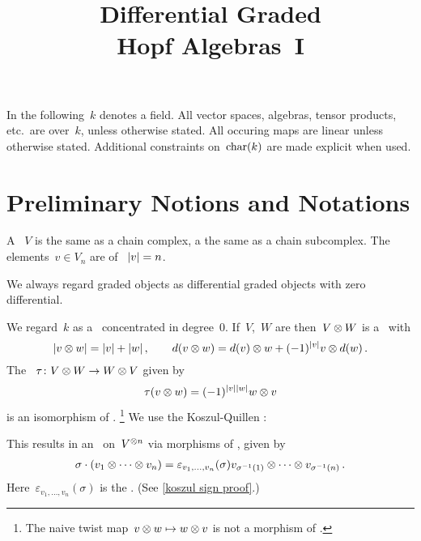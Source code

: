 \documentclass[a4paper,10pt,headings=standardclasses]{scrartcl}
\title{Differential Graded \\ Hopf Algebras~I}
\author{}
\date{}
\begin{document}
\maketitle

\vspace{-4em}

In the following~$k$ denotes a field.
All vector spaces, algebras, tensor products, etc.\ are over~$k$, unless otherwise stated.
All occuring maps are linear unless otherwise stated.
Additional constraints on~$\operatorname{char}(k)$ are made explicit when used.





\section{Preliminary Notions and Notations}
\label{notions and notations}

A ~$V$ is the same as a chain complex, a  the same as a chain subcomplex.
The elements~$v \in V_n$ are  of ~$\lvert v\rvert = n$.
\begin{center}
\end{center}
We always regard graded objects as differential graded objects with zero differential.
\begin{center}
\end{center}
We regard~$k$ as a~{\dgv} concentrated in degree~$0$.
If~$V$,~$W$ are {\dgvs} then~$V \otimes W$ is a {\dgv}~with
\[
  \lvert v \otimes w\rvert
  =
  \lvert v\rvert + \lvert w\rvert \,,
  \qquad
  d(v \otimes w)
  =
  d(v) \otimes w + (-1)^{\lvert v\rvert} v \otimes d(w) \,.
\]
The ~$\tau \colon V \otimes W \to W \otimes V$ given by
\[
  \tau(v \otimes w)
  =
  (-1)^{\lvert v\rvert \lvert w\rvert}
  w \otimes v
\]
is an isomorphism of {\dgvs}.%
\footnote{The naive twist map~$v \otimes w \mapsto w \otimes v$ is not a morphism of {\dgvs}.}
We use the Koszul-Quillen :
\begin{center}
\end{center}
This results in an~{} on~$V^{\otimes n}$ via morphisms of {\dgvs}, given by
\begin{gather*}
  \sigma \cdot (v_1 \otimes \dotsb \otimes v_n)
  =
  \varepsilon_{v_1, \dotsc, v_n}(\sigma)
  v_{\sigma^{-1}(1)} \otimes \dotsb \otimes v_{\sigma^{-1}(n)} \,.
\end{gather*}
Here~$\varepsilon_{v_1, \dotsc, v_n}(\sigma)$ is the .
(See \cref{koszul sign proof}.)
\end{document}
